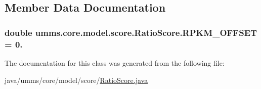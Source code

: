 \subsection{Member Data Documentation}
\hypertarget{classumms_1_1core_1_1model_1_1score_1_1_ratio_score_a03728176e61842d5a08f7aad5d594f28}{
\subsubsection[{R\+P\+K\+M\+\_\+\+O\+F\+F\+S\+E\+T}]{\setlength{\rightskip}{0pt plus 5cm}double umms.\+core.\+model.\+score.\+Ratio\+Score.\+R\+P\+K\+M\+\_\+\+O\+F\+F\+S\+E\+T = 0.\hspace{0.3cm}{\ttfamily [static]}}}\label{classumms_1_1core_1_1model_1_1score_1_1_ratio_score_a03728176e61842d5a08f7aad5d594f28}


The documentation for this class was generated from the following file\+:\begin{DoxyCompactItemize}
\item 
java/umms/core/model/score/\hyperlink{_ratio_score_8java}{Ratio\+Score.\+java}\end{DoxyCompactItemize}
